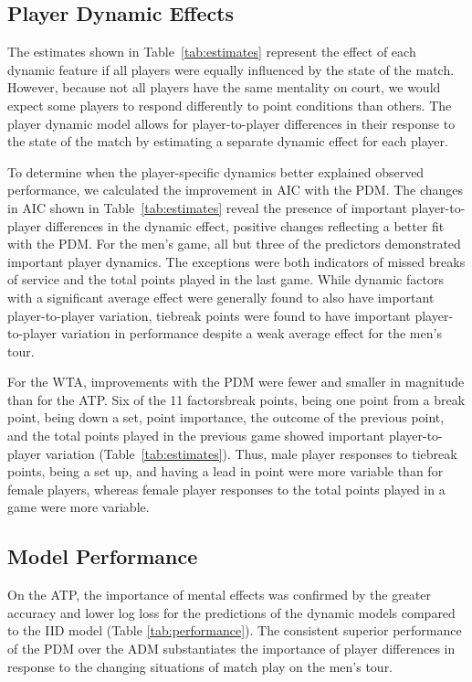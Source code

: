 \documentclass{Latex/svjour3}
\begin{document}
\subsection{Player Dynamic Effects}


The estimates shown in Table~\ref{tab:estimates} represent the effect of each
dynamic feature if all players were equally influenced by the state of the
match. However, because not all players have the same mentality on court, we
would expect some players to respond differently to point conditions than
others. The player dynamic model allows for player-to-player differences in
their response to the state of the match by estimating a separate dynamic effect
for each player.

To determine when the player-specific dynamics better explained observed
performance, we calculated the improvement in AIC with the PDM. The changes in
AIC shown in Table~\ref{tab:estimates} reveal the presence of important
player-to-player differences in the dynamic effect, positive changes reflecting
a better fit with the PDM. For the men's game, all but three of the predictors
demonstrated important player dynamics. The exceptions were both indicators of
missed breaks of service and the total points played in the last game. While
dynamic factors with a significant average effect were generally found to also
have important player-to-player variation, tiebreak points were found to have
important player-to-player variation in performance despite a weak average
effect for the men's tour.

For the WTA, improvements with the PDM were fewer and smaller in magnitude than
for the ATP. Six of the 11 factors\textemdash break points, being one point from
a break point, being down a set, point importance, the outcome of the previous
point, and the total points played in the previous game \textemdash showed
important player-to-player variation (Table~\ref{tab:estimates}). Thus, male
player responses to tiebreak points, being a set up, and having a lead in point
were more variable than for female players, whereas female player responses to
the total points played in a game were more variable.

\subsection{Model Performance}

On the ATP, the importance of mental effects was confirmed by the greater
accuracy and lower log loss for the predictions of the dynamic models compared
to the IID model (Table \ref{tab:performance}). The consistent superior
performance of the PDM over the ADM substantiates the importance of player
differences in response to the changing situations of match play on the men's
tour.
\end{document}
